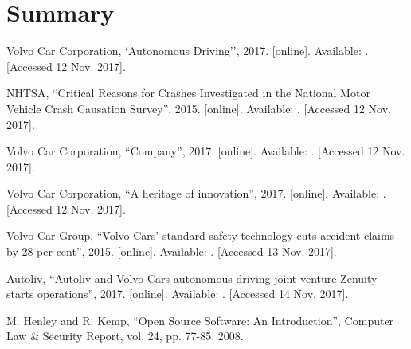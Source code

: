 \documentclass[conference]{IEEEtran}
\begin{document}

\section{Summary}


\begin{thebibliography}{00}
	Volvo Car Corporation,
	`Autonomous Driving'',
	2017.
	[online]. Available: .
	[Accessed 12 Nov. 2017].
	
	NHTSA,
	``Critical Reasons for Crashes Investigated in the National Motor Vehicle Crash Causation Survey'',
	2015.
	[online]. Available: .
	[Accessed 12 Nov. 2017].
	
	Volvo Car Corporation,
	``Company'',
	2017.
	[online]. Available: 
	.
	[Accessed 12 Nov. 2017].
	
	Volvo Car Corporation,
	``A heritage of innovation'',
	2017.
	[online]. Available: .
	[Accessed 12 Nov. 2017].
	
	Volvo Car Group,
	``Volvo Cars' standard safety technology cuts accident claims by 28 per cent'',
	2015.
	[online]. Available: .
	[Accessed 13 Nov. 2017].
	
	Autoliv,
	``Autoliv and Volvo Cars autonomous driving joint venture Zenuity starts operations'',
	2017.
	[online]. Available: .
	[Accessed 14 Nov. 2017].
	
	M. Henley and R. Kemp,
	``Open Source Software: An Introduction'', 
	Computer Law \& Security Report,
	vol. 24, pp. 77-85, 
	2008.
	

\end{thebibliography}
\end{document}
